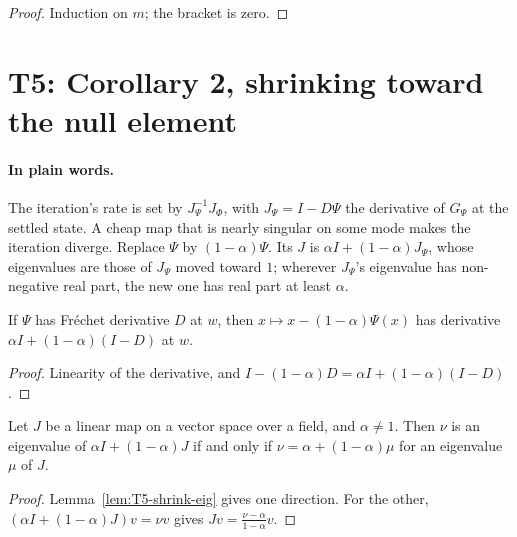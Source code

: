 \begin{proof}
  \leanok
  Induction on $m$; the bracket is zero.
\end{proof}

\section{T5: Corollary 2, shrinking toward the null element}

\paragraph{In plain words.}
The iteration's rate is set by $J_\Psi^{-1}J_\Phi$, with $J_\Psi=I-D\Psi$ the
derivative of $G_\Psi$ at the settled state.  A cheap map that is nearly
singular on some mode makes the iteration diverge.  Replace $\Psi$ by
$(1-\alpha)\Psi$.  Its $J$ is $\alpha I+(1-\alpha)J_\Psi$, whose eigenvalues are
those of $J_\Psi$ moved toward $1$; wherever $J_\Psi$'s eigenvalue has
non-negative real part, the new one has real part at least $\alpha$.

\begin{lemma}\label{lem:T5-shrink-deriv}
  \leanok
  If $\Psi$ has Fr\'echet derivative $D$ at $w$, then
  $x\mapsto x-(1-\alpha)\Psi(x)$ has derivative
  $\alpha I+(1-\alpha)(I-D)$ at $w$.
\end{lemma}

\begin{proof}
  \leanok
  Linearity of the derivative, and
  $I-(1-\alpha)D=\alpha I+(1-\alpha)(I-D)$.
\end{proof}

\begin{theorem}\label{thm:T5-shrink}
  \leanok
  Let $J$ be a linear map on a vector space over a field, and $\alpha\ne1$.
  Then $\nu$ is an eigenvalue of $\alpha I+(1-\alpha)J$ if and only if
  $\nu=\alpha+(1-\alpha)\mu$ for an eigenvalue $\mu$ of $J$.
\end{theorem}

\begin{proof}
  \leanok
  Lemma~\ref{lem:T5-shrink-eig} gives one direction.  For the other,
  $(\alpha I+(1-\alpha)J)v=\nu v$ gives $Jv=\frac{\nu-\alpha}{1-\alpha}v$.
\end{proof}

